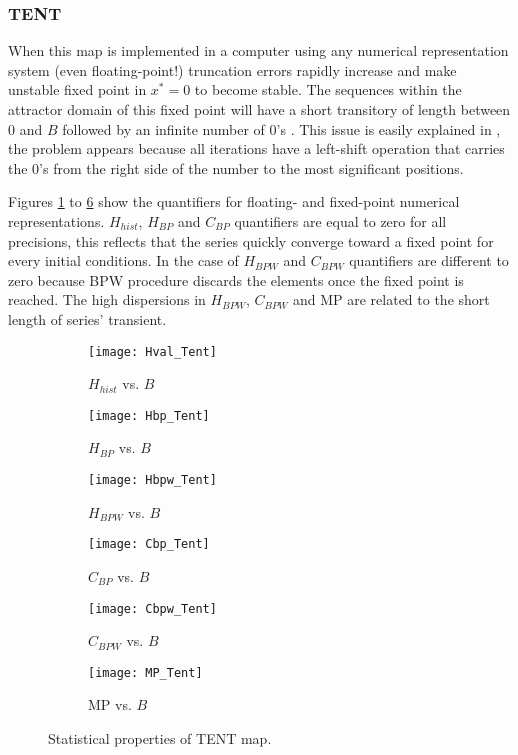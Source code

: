 \subsubsection{TENT} \label{sssec:tent}

When this map is implemented in a computer using any numerical representation system (even floating-point!) truncation errors rapidly increase and make unstable fixed point in $x^*=0$ to become stable.
The sequences within the attractor domain of this fixed point will have a short transitory of length between $0$ and $B$ followed by an infinite number of $0$'s \cite{Jessa2002,Callegari}.
This issue is easily explained in \cite{Li2004}, the problem appears because all iterations have a left-shift operation that carries the $0$'s from the right side of the number to the most significant positions.

Figures \ref{fig:Hval_Tent} to \ref{fig:MP_Tent} show the quantifiers for floating- and fixed-point numerical representations.
$H_{hist}$, $H_{BP}$ and $C_{BP}$ quantifiers are equal to zero for all precisions, this reflects that the series quickly converge toward a fixed point for every initial conditions.
In the case of $H_{BPW}$ and $C_{BPW}$ quantifiers are different to zero because BPW procedure discards the elements once the fixed point is reached.
The high dispersions in $H_{BPW}$, $C_{BPW}$ and MP are related to the short length of series' transient.
%
\begin{figure}[H]
	\centering
	\begin{subfigure}[b]{0.49\textwidth}
		\texttt{[image: Hval\_Tent]}
		\caption{$H_{hist}$ vs. $B$}
		\label{fig:Hval_Tent}
	\end{subfigure}
	\begin{subfigure}[b]{0.49\textwidth}
		\texttt{[image: Hbp\_Tent]}
		\caption{$H_{BP}$ vs. $B$}
		\label{fig:Hbp_Tent}
	\end{subfigure}
	\begin{subfigure}[b]{0.49\textwidth}
		\texttt{[image: Hbpw\_Tent]}
		\caption{$H_{BPW}$ vs. $B$}
		\label{fig:Hbpw_Tent}
	\end{subfigure}
	\begin{subfigure}[b]{0.49\textwidth}
		\texttt{[image: Cbp\_Tent]}
		\caption{$C_{BP}$ vs. $B$}
		\label{fig:Cbp_Tent}
	\end{subfigure}
	\begin{subfigure}[b]{0.49\textwidth}
		\texttt{[image: Cbpw\_Tent]}
		\caption{$C_{BPW}$ vs. $B$}
		\label{fig:Cbpw_Tent}
	\end{subfigure}
	\begin{subfigure}[b]{0.49\textwidth}
		\texttt{[image: MP\_Tent]}
		\caption{MP vs. $B$}
		\label{fig:MP_Tent}
	\end{subfigure}
	\caption{Statistical properties of TENT map.}
	\label{fig:TENT_QuantiB}
\end{figure}

